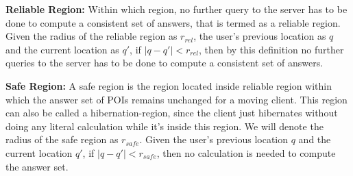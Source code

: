 \documentclass{sig-alternate}
\begin{document}
\begin{defn}
\textbf{Reliable Region:} Within which region, no further query to the server has to be done to compute a consistent set of answers, that is termed as a reliable region. Given the radius of the reliable region as $r_{rel}$, the user's previous location as $q$ and the current location as $q'$, if $\vert q-q'\vert < r_{rel}$, then by this definition no further queries to the server has to be done to compute a consistent set of answers.
\end{defn}

\begin{defn} \label{def:safe_region}
\textbf{Safe Region:} A safe region is the region located inside reliable region within which the answer set of POIs remains unchanged for a moving client. This region can also be called a hibernation-region, since the client just hibernates without doing any literal calculation while it's inside this region. We will denote the radius of the safe region as $r_{safe}$. Given the user's previous location $q$ and the current location $q'$, if $\vert q-q'\vert < r_{safe}$, then no calculation is needed to compute the answer set.
\end{defn}
 
\end{document}
